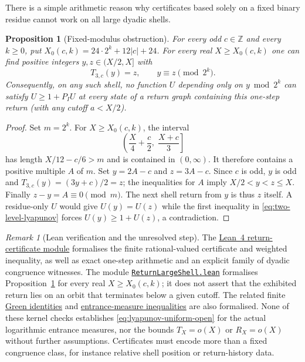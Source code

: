 \documentclass[11pt]{article}
\newtheorem{proposition}[theorem]{Proposition}
\theoremstyle{remark}
\newtheorem{remark}[theorem]{Remark}
\newcommand{\Z}{\mathbb{Z}}
\begin{document}
There is a simple arithmetic reason why certificates based solely on a
fixed binary residue cannot work on all large dyadic shells.

\begin{proposition}[Fixed-modulus obstruction]
\label{prop:residue-obstruction}
For every odd $c\in\Z$ and every $k\ge0$, put $X_0(c,k)=24\cdot2^k+12|c|+24$.
For every real $X\ge X_0(c,k)$ one can find positive integers
$y,z\in(X/2,X]$ with
\[
 T_{3,c}(y)=z,\qquad y\equiv z\pmod{2^k}.
\]
Consequently, on any such shell, no function $U$ depending only on
$y\bmod2^k$ can satisfy $U\ge1+P_IU$ at every state of a return graph
containing this one-step return (with any cutoff $a<X/2$).
\end{proposition}
\begin{proof}
Set $m=2^k$.  For $X\ge X_0(c,k)$, the interval
\[
 \left(\frac X4+\frac c2,\;\frac{X+c}{3}\right]
\]
has length $X/12-c/6>m$ and is contained in $(0,\infty)$.
It therefore contains a positive multiple $A$ of $m$.  Set
$y=2A-c$ and $z=3A-c$.  Since $c$ is odd, $y$ is odd and
$T_{3,c}(y)=(3y+c)/2=z$; the inequalities for $A$ imply
$X/2<y<z\le X$.  Finally $z-y=A\equiv0\pmod m$.
The next shell return from $y$ is thus $z$ itself.  A residue-only
$U$ would give $U(y)=U(z)$ while the first inequality in
\eqref{eq:two-level-lyapunov} forces $U(y)\ge1+U(z)$, a contradiction.
\end{proof}

\begin{remark}[Lean verification and the unresolved step]
\label{rem:lyapunov-certification}
The \href{https://github.com/Sultanow/collatz/blob/ee5a5b4/07\%20Basins\%20of\%20Attraction/lean/CollatzBasins/ReturnLyapunov.lean}{Lean~4 return-certificate module}
formalises the finite rational-valued certificate and weighted inequality,
as well as exact one-step arithmetic and an explicit family of dyadic
congruence witnesses.  The module \href{https://github.com/Sultanow/collatz/blob/ee5a5b4/07\%20Basins\%20of\%20Attraction/lean/CollatzBasins/ReturnLargeShell.lean}{\texttt{ReturnLargeShell.lean}}
formalises Proposition~\ref{prop:residue-obstruction} for every real
$X\ge X_0(c,k)$; it does not assert that the exhibited return lies on an
orbit that terminates below a given cutoff.  The related finite
\href{https://github.com/Sultanow/collatz/blob/ee5a5b4/07\%20Basins\%20of\%20Attraction/lean/CollatzBasins/ReturnGreen.lean}{Green identities}
and \href{https://github.com/Sultanow/collatz/blob/ee5a5b4/07\%20Basins\%20of\%20Attraction/lean/CollatzBasins/EntranceTransport.lean}{entrance-measure inequalities}
are also formalised.  None of these kernel checks establishes
\eqref{eq:lyapunov-uniform-open} for the actual logarithmic entrance
measures, nor the bounds $T_X=o(X)$ or $R_X=o(X)$ without further
assumptions.  Certificates must encode more than a fixed congruence
class, for instance relative shell position or return-history data.
\end{remark}
\end{document}
